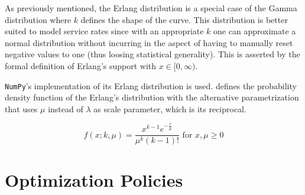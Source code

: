 \documentclass[draft=false]{seal_thesis}
\begin{document}
As previously mentioned, the Erlang distribution is a special case of the Gamma distribution where $k$ defines the shape of the curve. This distribution is better suited to model service rates since with an appropriate $k$ one can approximate a normal distribution without incurring in the aspect of having to manually reset negative values to one (thus loosing statistical generality). This is asserted by the formal definition of Erlang's support with $x \in [0,\infty)$.

\texttt{NumPy}'s implementation of its Erlang distribution is used.  defines the probability density function of the Erlang's distribution with the alternative parametrization that uses $\mu$ instead of $\lambda$ as scale parameter, which is its reciprocal.

\begin{equation}
\label{eq:erlang_density}
	f(x;k,\mu) = \frac{x^{k-1} e^{-\frac{x}{\mu}}}{\mu^k (k-1)!} \text{ for } x,\mu \geq 0
\end{equation}

\section{Optimization Policies}
\label{sec:opt_policies}
\end{document}
